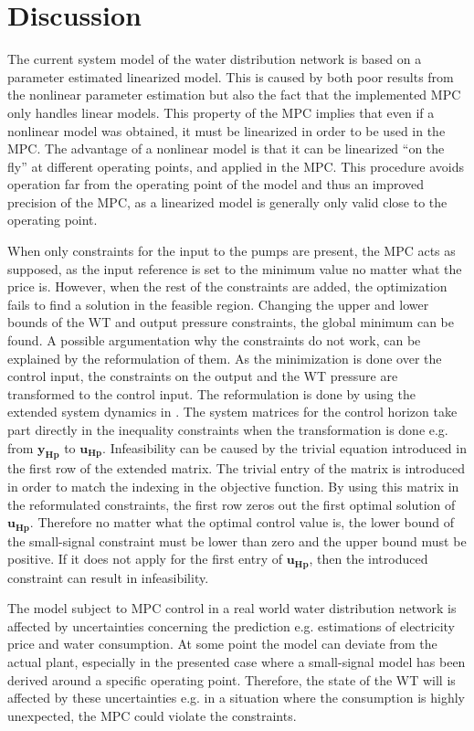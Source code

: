 \chapter{Discussion}
\label{Discussion}

The current system model of the water distribution network is based on a parameter estimated linearized model. This is caused by both poor results from the nonlinear parameter estimation but also the fact that the implemented MPC only handles linear models. This property of the MPC implies that even if a nonlinear model was obtained, it must be linearized in order to be used in the MPC. The advantage of a nonlinear model is that it can be linearized ``on the fly'' at different operating points, and applied in the MPC. This procedure avoids operation far from the operating point of the model and thus an improved precision of the MPC, as a linearized model is generally only valid close to the operating point.    

When only constraints for the input to the pumps are present, the MPC acts as supposed, as the input reference is set to the minimum value no matter what the price is. However, when the rest of the constraints are added, the optimization fails to find a solution in the feasible region. Changing the upper and lower bounds of the WT and output pressure constraints, the global minimum can be found. 
A possible argumentation why the constraints do not work, can be explained by the reformulation of them. As the minimization is done over the control input, the constraints on the output and the WT pressure are transformed to the control input. The reformulation is done by using the extended system dynamics in . The system matrices for the control horizon take part directly in the inequality constraints when the transformation is done e.g. from $\bm{y_{Hp}}$ to $\bm{u_{Hp}}$. Infeasibility can be caused by the trivial equation introduced in the first row of the extended matrix. The trivial entry of the matrix is introduced in order to match the indexing in the objective function. By using this matrix in the reformulated constraints, the first row zeros out the first optimal solution of $\bm{u_{Hp}}$. Therefore no matter what the optimal control value is, the lower bound of the small-signal constraint must be lower than zero and the upper bound must be positive. If it does not apply for the first entry of $\bm{u_{Hp}}$, then the introduced constraint can result in infeasibility. 

The model subject to MPC control in a real world water distribution network is affected by uncertainties concerning the prediction e.g. estimations of electricity price and water consumption. At some point the model can deviate from the actual plant, especially in the presented case where a small-signal model has been derived around a specific operating point. Therefore, the state of the WT will is affected by these uncertainties e.g. in a situation where the consumption is highly unexpected, the MPC could violate the constraints.

